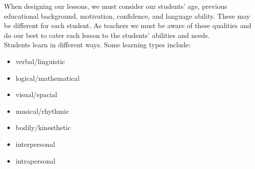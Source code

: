 \begin{figure}[h!]
\centering
\setlength\fboxsep{0pt}
\setlength\fboxrule{2pt}
\end{figure}

When designing our lessons, we must consider our students' age, previous educational background, motivation, confidence, and language ability.  These may be different for each student.  As teachers we must be aware of these qualities and do our best to cater each lesson to the students’ abilities and needs.\\

Students learn in different ways.  Some learning types include: 
\begin{itemize}
\item verbal/linguistic
\item logical/mathematical
\item visual/spacial
\item musical/rhythmic
\item bodily/kinesthetic
\item interpersonal 
\item intrapersonal 
\end{itemize}




